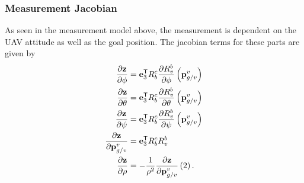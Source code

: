 \subsubsection{Measurement Jacobian}
As seen in the measurement model above, the measurement is dependent on the UAV
attitude as well as the goal position. The jacobian terms for these parts are
given by
\begin{align}
  \frac{\partial \boldsymbol{\mathrm{z}}}{\partial \phi} &= \boldsymbol{\mathrm{e}}_3^{\mathsf{T}} R_b^c \frac{
    \partial R_v^b}{\partial \phi} \left( \boldsymbol{\mathrm{p}}_{g/v}^v \right) \\
  \frac{\partial \boldsymbol{\mathrm{z}}}{\partial \theta} &= \boldsymbol{\mathrm{e}}_3^{\mathsf{T}} R_b^c \frac{
    \partial R_v^b}{\partial \theta} \left( \boldsymbol{\mathrm{p}}_{g/v}^v \right) \\
  \frac{\partial \boldsymbol{\mathrm{z}}}{\partial \psi} &= \boldsymbol{\mathrm{e}}_3^{\mathsf{T}} R_b^c \frac{
    \partial R_v^b}{\partial \psi} \left( \boldsymbol{\mathrm{p}}_{g/v}^v \right) \\
    \frac{\partial \boldsymbol{\mathrm{z}}}{\partial \boldsymbol{\mathrm{p}}_{g/v}^v} &= \boldsymbol{\mathrm{e}}_3^{\mathsf{T}} R_b^c
    R_v^b \\
  \frac{\partial \boldsymbol{\mathrm{z}}}{\partial \rho} &= -\frac{1}{\rho^2}
    \frac{\partial \boldsymbol{\mathrm{z}}}{\partial \boldsymbol{\mathrm{p}}_{g/v}^v}\left(2\right).
\end{align}
